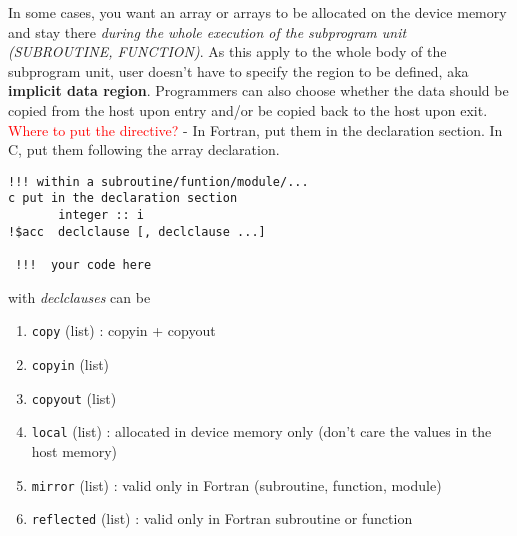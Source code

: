 In some cases, you want an array or arrays to be allocated on the
device memory and stay there
{\it during the whole execution of the subprogram unit (SUBROUTINE,
  FUNCTION)}.
As this apply to the whole body of the subprogram unit, user doesn't
have to specify the region to be defined, aka
{\bf implicit data region}.  Programmers can also choose whether the
data should be copied from the host upon entry and/or be copied back
to the host upon exit.
\textcolor{red}{Where to put the directive?} - In Fortran, put them in
the declaration section. In C, put them following the array
declaration.

\begin{lstlisting}
!!! within a subroutine/funtion/module/...
c put in the declaration section
       integer :: i
!$acc  declclause [, declclause ...]

 !!!  your code here
\end{lstlisting}
with {\it declclauses} can be
\begin{enumerate}
\item \verb!copy! (list) : copyin + copyout
\item \verb!copyin! (list)
\item \verb!copyout! (list)
\item \verb!local! (list) : allocated in device memory only (don't
  care the values in the host memory)
\item \verb!mirror! (list) : valid only in Fortran (subroutine,
  function, module)
\item \verb!reflected! (list) : valid only in Fortran subroutine or
  function
\end{enumerate}

